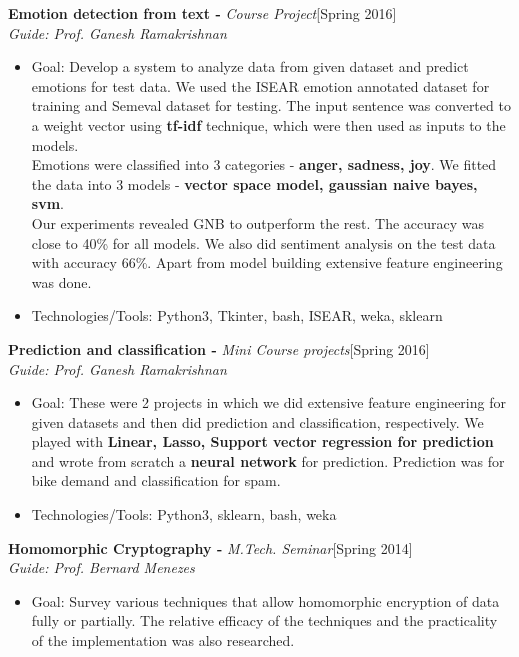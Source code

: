 \documentclass[a4paper,10pt]{article}
\begin{document}
\noindent
\textbf{Emotion detection from text -} \emph{Course Project}\hfill[Spring 2016] \\
\emph{Guide: Prof. Ganesh Ramakrishnan}
\begin{itemize}
 \item Goal: Develop a system to analyze data from given dataset and predict emotions for test data. We used the ISEAR emotion annotated dataset for training and Semeval dataset for testing. The input sentence was converted to a weight vector using \textbf{tf-idf} technique, which were then used as inputs to the models.\\
 Emotions were classified into 3 categories - \textbf{anger, sadness, joy}. We fitted the data into 3 models - \textbf{vector space model, gaussian naive bayes, svm}. \\Our experiments revealed GNB to outperform the rest. The accuracy was close to 40\% for all models. We also did sentiment analysis on the test data with accuracy 66\%. Apart from model building extensive feature engineering was done.
 \item Technologies/Tools: Python3, Tkinter, bash, ISEAR, weka, sklearn
\end{itemize}

\noindent
\textbf{Prediction and classification -} \emph{Mini Course projects}\hfill[Spring 2016] \\
\emph{Guide: Prof. Ganesh Ramakrishnan}
\begin{itemize}
 \item Goal: These were 2 projects in which we did extensive feature engineering for given datasets and then did prediction and classification, respectively. We played with \textbf{Linear, Lasso, Support vector regression for prediction} and wrote from scratch a \textbf{neural network} for prediction. Prediction was for bike demand and classification for spam.
  \item Technologies/Tools: Python3, sklearn, bash, weka
\end{itemize}

\noindent
\textbf{Homomorphic Cryptography -} \emph{M.Tech. Seminar}\hfill[Spring 2014] \\
\emph{Guide: Prof. Bernard Menezes}
\begin{itemize}
 \item Goal: Survey various techniques that allow homomorphic encryption of data fully or partially. The relative efficacy of the techniques and the practicality of the implementation was also researched.
\end{itemize}
\end{document}
